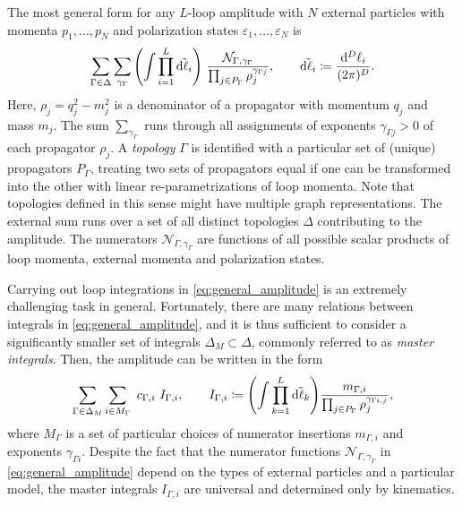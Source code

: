 The most general form for any $L$-loop amplitude with $N$ external particles with momenta $p_1,\ldots,p_N$ and polarization states $\varepsilon_1,\ldots,\varepsilon_N$ is
\begin{equation}
  \sum_{\Gamma \in \Delta} \sum_{\gamma_\Gamma} \qty(\int \prod_{i=1}^{L} \tilde{\dd{\ell_i}}) ~ 
  \frac{\mathcal{N}_{\Gamma,\gamma_\Gamma}%
    }{\prod_{j\in P_\Gamma} \rho_j^{\gamma_{\Gamma j}}},
    \qquad \tilde{\dd{\ell_i}} \coloneqq \frac{\dd[D]{\ell_i}}{(2\pi)^{D}}.
  \label{eq:general_amplitude}
\end{equation}
Here, $\rho_j = q_j^2 - m_j^2$ is a denominator of a propagator with momentum $q_j$ and mass $m_j$. The sum $\sum_{\gamma_\Gamma}$ runs through all assignments
of exponents $\gamma_{\Gamma j} > 0$ of each propagator $\rho_j$. 
A \emph{topology} $\Gamma$ is identified with a particular set of (unique) propagators $P_\Gamma$,
treating two sets of propagators equal if one can be transformed into the other with linear re-parametrizations of loop momenta.
Note that topologies defined in this sense might have multiple graph representations.
The external sum runs over a set of all distinct topologies $\Delta$ contributing to the amplitude.
The numerators $\mathcal{N}_{\Gamma,\gamma_\Gamma}$
are functions of all possible scalar products of loop momenta, external momenta and polarization states.

Carrying out loop integrations in \cref{eq:general_amplitude} is an extremely challenging task in general.
Fortunately, there are many relations between integrals in \cref{eq:general_amplitude},
and it is thus sufficient to consider a significantly smaller set of integrals $\Delta_M \subset \Delta$, commonly referred to
as \emph{master integrals}. Then, the amplitude can be written in the form
\begin{equation}
  \sum_{\Gamma \in \Delta_M} \sum_{i\in M_\Gamma} ~ c_{\Gamma,i} ~ I_{\Gamma,i}, 
    \qquad I_{\Gamma,i} \coloneqq 
      \qty(\int \prod_{k=1}^{L} \tilde{\dd{\ell_k}}) \frac{m_{\Gamma,i}}{\prod_{j\in P_\Gamma} \rho_j^{\gamma_{\Gamma i,j}}},
  \label{eq:amplitude_integrated}
\end{equation}
where $M_{\Gamma}$ is a set of particular choices of numerator insertions $m_{\Gamma,i}$ and exponents $\gamma_{\Gamma i}$.
Despite the fact that the numerator functions $\mathcal{N}_{\Gamma,\gamma_\Gamma}$ in \cref{eq:general_amplitude} depend on the types of external particles and a particular model,
the master integrals $I_{\Gamma,i}$ are universal and determined only by kinematics.

